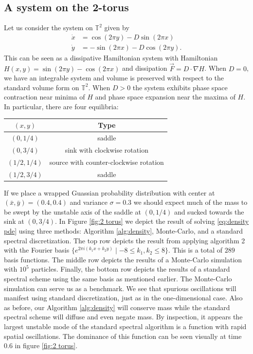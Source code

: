 \documentclass[12pt]{amsart}
\begin{document}
\subsection{A system on the 2-torus}
Let us consider the system on $\mathbb{T}^{2}$ given by 
\begin{align}
	\dot{x} &= \cos(2\pi y) - D \sin(2\pi x) \\
	\dot{y} &= -\sin(2 \pi x) - D \cos(2 \pi y).
\end{align}
This can be seen as a dissipative Hamiltonian system with Hamiltonian $H(x,y) = \sin(2 \pi y) - \cos(2 \pi x)$ and dissipation $\vec{F} = D \cdot \nabla H$.
When $D=0$, we have an integrable system and volume is preserved with respect to the standard volume form on $\mathbb{T}^{2}$.
When $D>0$ the system exhibits phase space contraction near minima of $H$ and phase space expansion near the maxima of $H$.
In particular, there are four equilibria:
\begin{center}
\begin{tabular}{cc}
	$(x,y)$ & Type \\
	\hline
	$(0, 1/4)$ & saddle \\
	$(0, 3/4)$ & sink with clockwise rotation\\
	$(1/2,1/4)$ & source with counter-clockwise rotation \\
	$(1/2,3/4)$ & saddle
\end{tabular}
\end{center}

If we place a wrapped Guassian probability distribution with center at $(\bar{x},\bar{y}) = (0.4,0.4)$ and variance $\sigma = 0.3$ we should expect much of the mass to be swept by the unstable
axis of the saddle at $(0,1/4)$ and sucked towards the sink at $(0,3/4)$.
In Figure \ref{fig:2 torus} we depict the result of solving \eqref{eq:density pde} using three methods: Algorithm \ref{alg:density}, Monte-Carlo, and a standard spectral discretization.
The top row depicts the result from applying algorithm 2 with the Fourier basis $\{ e^{2\pi i (k_{1}x +k_{2}y)} \mid -8 \leq k_{1},k_{2} \leq 8\}$.
This is a total of $289$ basis functions. 
The middle row depicts the results of a Monte-Carlo simulation with $10^{5}$ particles.
Finally, the bottom row depicts the results of a standard spectral scheme using the same basis as mentioned earlier.
The Monte-Carlo simulation can serve us as a benchmark.
We see that spurious oscillations will manifest using standard discretization, just as in the one-dimensional case.
Also as before, our Algorithm \ref{alg:density} will conserve mass while the standard spectral scheme will diffuse and even negate mass.
By inspection, it appears the largest unstable mode of the standard spectral algorithm is a function with rapid spatial oscillations.
The dominance of this function can be seen visually at time $0.6$ in figure \ref{fig:2 torus}.
\end{document}
